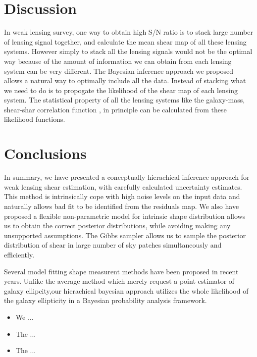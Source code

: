 \documentclass[useAMS,usenatbib]{mn2e}
\begin{document}



\section{Discussion}

\label{sec:XXX} In weak lensing survey, one way to obtain high S/N
ratio is to stack large number of lensing signal together, and calculate
the mean shear map of all these lensing systems. However simply to
stack all the lensing signals would not be the optimal way because
of the amount of information we can obtain from each lensing system
can be very different. The Bayesian inference approach we proposed
allows a natural way to optimally include all the data. Instead of
stacking what we need to do is to propogate the likelihood of the
shear map of each lensing system. The statistical property of all
the lensing systems like the galaxy-mass, shear-shar correlation function
, in principle can be calculated from these likelihood functions.






\section{Conclusions}

\label{sec:conclusions}

In summary, we have presented a conceptually hierachical inference
approach for weak lensing shear estimation, with carefully calculated 
uncertainty estimates. This method is intrinsically cope with high noise
levels on the input data and naturally allows bad fit to be identified 
from the residuals map. We also have proposed a flexible non-parametric model 
for intrinsic shape distribution allows us to obtain the correct posterior 
distributions, while avoiding making any unsupported assumptions. The Gibbs
sampler allows us to sample the posterior distribution of shear in large number of
sky patches simultaneously and efficiently.

Several  model fitting  shape measurent methods have been proposed in recent years.
Unlike the average method which merely request a point estimator of galaxy ellipcity,our 
hierachical bayesian approach utilizes the whole likelihood of the galaxy ellipticity in a Bayesian probability analysis framework.
\begin{itemize}
\item We ...
\item The ...
\item The ...
\end{itemize}
\end{document}
